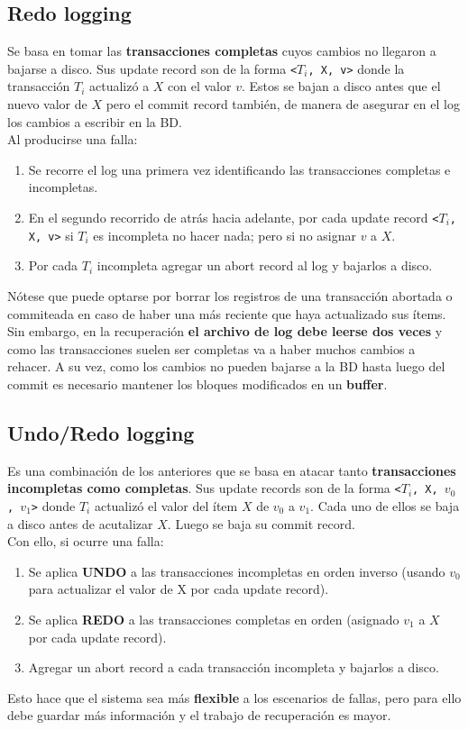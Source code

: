 \subsection*{Redo logging}
Se basa en tomar las \textbf{transacciones completas} cuyos cambios no llegaron a bajarse a disco. Sus update record son de la forma \texttt{<$T_i$, X, v>} donde la transacción $T_i$ actualizó a $X$ con el valor $v$. Estos se bajan a disco antes que el nuevo valor de $X$ pero el commit record también, de manera de asegurar en el log los cambios a escribir en la BD. \\
Al producirse una falla:
\begin{enumerate}
    \item Se recorre el log una primera vez identificando las transacciones completas e incompletas.
    \item En el segundo recorrido de atrás hacia adelante, por cada update record \texttt{<$T_i$, X, v>} si $T_i$ es incompleta no hacer nada; pero si no asignar $v$ a $X$.
    \item Por cada $T_i$ incompleta agregar un abort record al log y bajarlos a disco.
\end{enumerate}
Nótese que puede optarse por borrar los registros de una transacción abortada o commiteada en caso de haber una más reciente que haya actualizado sus ítems. Sin embargo, en la recuperación \textbf{el archivo de log debe leerse dos veces} y como las transacciones suelen ser completas va a haber muchos cambios a rehacer. A su vez, como los cambios no pueden bajarse a la BD hasta luego del commit es necesario mantener los bloques modificados en un \textbf{buffer}.

\subsection*{Undo/Redo logging}
Es una combinación de los anteriores que se basa en atacar tanto \textbf{transacciones incompletas como completas}. Sus update records son de la forma \texttt{<$T_i$, X, $v_0$, $v_1$>} donde $T_i$ actualizó el valor del ítem $X$ de $v_0$ a $v_1$. Cada uno de ellos se baja a disco antes de acutalizar $X$. Luego se baja su commit record. \\
Con ello, si ocurre una falla:
\begin{enumerate}
    \item Se aplica \textbf{UNDO} a las transacciones incompletas en orden inverso (usando $v_0$ para actualizar el valor de X por cada update record).
    \item Se aplica \textbf{REDO} a las transacciones completas en orden (asignado $v_1$ a $X$ por cada update record).
    \item Agregar un abort record a cada transacción incompleta y bajarlos a disco.
\end{enumerate}
Esto hace que el sistema sea más \textbf{flexible} a los escenarios de fallas, pero para ello debe guardar más información y el trabajo de recuperación es mayor.

